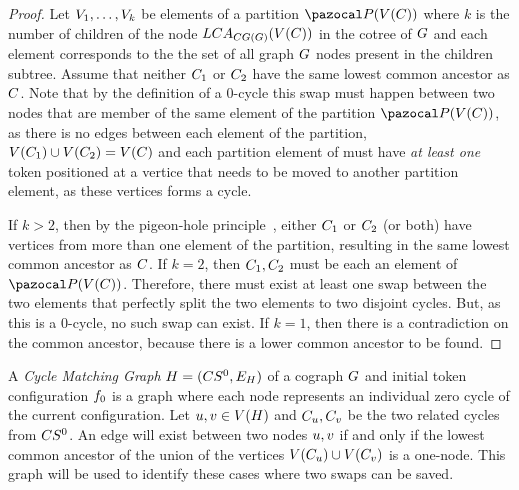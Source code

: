\documentclass[msc,english,table,xcdraw]{ppgccufmg}
\begin{document}
\begin{proof}
Let $V_{1}, \ldots, V_{k}$ be elements of a partition 
$\partitionFunc{\vertexFunc{\cycle}}$ where $k$ is the number of children 
of the node $LCA_{CG(G)}(V(C))$
in the cotree of $G$ and each element corresponds to the the set of
all graph $G$ nodes present in the children subtree.
Assume that neither $C_{1}$ or $C_{2}$ have the same lowest common
ancestor as $C$.
Note that by the definition of a 0-cycle this swap must happen between two
nodes that are member of the same element of the partition $\partitionFunc
{\vertexFunc{\cycle}}$, as there is no edges between each element of the 
partition, $V(C_{1}) \cup V(C_{2}) = 
V(C)$ and each partition element of must have \textit{at least 
one} token positioned at a vertice that needs to be moved to another partition 
element, as these vertices forms a cycle.

If $k > 2$, then by the pigeon-hole principle~\citep{Erdos:1987,Razborov:2002}, 
either $C_{1}$ or $C_{2}$ (or both) have vertices from more than 
one element of the partition, resulting in the same lowest common ancestor 
as $C$.
If $k = 2$, then $C_{1},C_{2}$ must be each an element of 
$\partitionFunc{\vertexFunc{\cycle}}$.
Therefore, there must exist at least one swap between the two elements that
perfectly split the two elements to two disjoint cycles.
But, as this is a 0-cycle, no such swap can exist.
If $k = 1$, then there is a contradiction on the common ancestor, because
there is a lower common ancestor to be found.
\end{proof}

A \textit{Cycle Matching Graph} $H = (CS^{0}, 
E_{H})$ of a cograph $G$ and initial token 
configuration $f_{0}$ is a graph where each node represents an individual zero
cycle of the current configuration. 
Let $u, v \in V(H)$ and $C_{u}, 
C_{v}$ be the two related cycles from $CS^{0}$.
An edge will exist between two nodes $u,v$ if and only if the lowest 
common ancestor of the union of the vertices $V(C_{u}) \cup
V(C_{v})$ is a one-node.
This graph will be used to identify these cases where two swaps can be saved.
\end{document}
